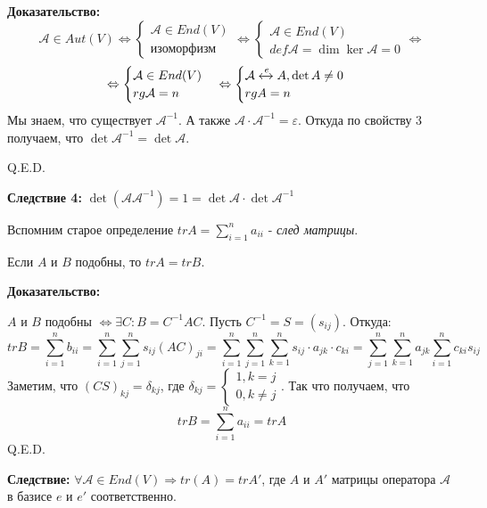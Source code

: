 \textbf{Доказательство:}
$$\mathcal{A} \in Aut(V) \Leftrightarrow \begin{cases}
    \mathcal{A} \in End(V) \\
    \text{изоморфизм}
\end{cases} \Leftrightarrow \begin{cases}
    \mathcal{A} \in End(V)\\
    def \mathcal{A} = \dim \ker \mathcal{A} = 0
\end{cases} \Leftrightarrow $$
$$\Leftrightarrow\begin{cases}
    \mathcal{A}\in End(V) \\
    rg \mathcal{A} = n
\end{cases} \Leftrightarrow \begin{cases}
    \mathcal{A} \xleftrightarrow{e} A,\det A \neq 0 \\
    rg A = n
\end{cases}$$
Мы знаем, что существует $\mathcal{A}^{-1}$. А также $\mathcal{A}\cdot \mathcal{A}^{-1}=\varepsilon$. Откуда по свойству 3 получаем, что $\det\mathcal{A} ^{-1}=\det \mathcal{A}$.

\hfill Q.E.D.

\textbf{Следствие 4:} $\det( \mathcal{A} \mathcal{A}^{-1})= 1 = \det  \mathcal{A} \cdot \det \mathcal{A}^{-1}$


Вспомним старое определение $tr A = \sum\limits_{i=1}^n a_{ii}$ - \emph{след матрицы}.


Если $A$ и $B$ подобны, то $tr A = tr B$.

\textbf{Доказательство:}

$A$ и $B$ подобны $\Leftrightarrow\exists C :B =C^{-1}AC$. Пусть $C^{-1} = S = (s_{ij})$. Откуда:
$$tr B = \sum\limits_{i=1}^n b_{ii} = \sum\limits_{i=1}^n \sum\limits_{j=1}^ns_{ij} (AC)_{ji} = \sum\limits_{i=1}^n \sum\limits_{j=1}^n \sum\limits_{k=1}^n s_{ij}\cdot a_{jk} \cdot c_{ki} = \sum\limits_{j=1}^n\sum\limits_{k=1}^n a_{jk}\sum\limits_{i=1}^nc_{ki}s_{ij}$$
Заметим, что $(CS)_{kj} = \delta_{kj}$, где $\delta_{kj}=\begin{cases}
    1, k=j\\
    0, k\neq j
\end{cases}$. Так что получаем, что 
$$tr B = \sum\limits_{i=1}^n a_{ii} = tr A$$
\hfill Q.E.D.

\textbf{Следствие:} $\forall \mathcal{A} \in End(V) \Rightarrow tr(A) = tr A'$, где $A$ и $A'$ матрицы оператора $\mathcal{A}$ в базисе $e$ и $e'$ соответственно.

